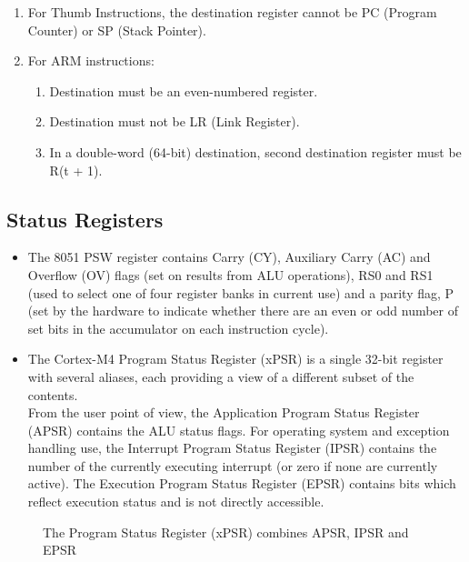 \documentclass{article}
\begin{document}
\begin{table}[H]
  \vspace*{2mm}
  \begin{enumerate}
    \item For Thumb Instructions, the destination register cannot be PC (Program Counter) or SP (Stack Pointer).
    \item For ARM instructions:
    \begin{enumerate}
      \item Destination must be an even-numbered register.
      \item Destination must not be LR (Link Register).
      \item In a double-word (64-bit) destination, second destination register must be R(t + 1).
    \end{enumerate}
  \end{enumerate}

  \end{table}  \subsection{Status Registers} \label{subsection:Status Registers} 

  \begin{itemize}
      \item The 8051 PSW register contains Carry (CY), Auxiliary Carry (AC) and Overflow (OV) flags
      (set on results from ALU operations), RS0 and RS1 (used to select one of four register
      banks in current use) and a parity flag, P (set by the hardware to indicate whether there
      are an even or odd number of set bits in the accumulator on each instruction cycle).
      \item The Cortex-M4 Program Status Register (xPSR) is a single 32-bit register with several
      aliases, each providing a view of a different subset of the contents.\\ From the user point of
      view, the Application Program Status Register (APSR) contains the ALU status flags. For
      operating system and exception handling use, the Interrupt Program Status Register
      (IPSR) contains the number of the currently executing interrupt (or zero if none are currently
      active). The Execution Program Status Register (EPSR) contains bits which reflect
      execution status and is not directly accessible.
  \end{itemize}
  
  \begin{figure}[H]
    \caption{The Program Status Register (xPSR) combines APSR, IPSR and EPSR}
    \label{PSR}
  \end{figure}
\end{document}
